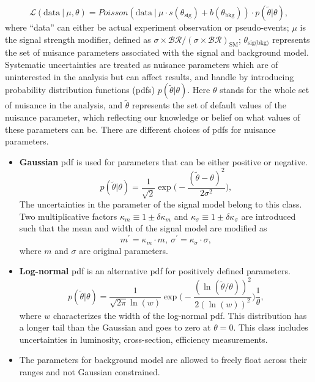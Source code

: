 	\begin{equation}
	\mathcal{L}(\text{data}\ |\ \mu ,\theta) = Poisson(\text{data}\ |\ \mu\cdot s(\theta_{\text{sig}}) + b(\theta_{\text{bkg}}))\cdot p(\tilde{\theta}|\theta),
	\end{equation}
	where ``data'' can either be actual experiment observation or pseudo-events; $\mu$ is the signal strength modifier, defined as $\sigma\times\mathcal{BR}/(\sigma\times\mathcal{BR})_{\text{SM}}$; $\theta_{\text{sig(bkg)}}$ represents the set of nuisance parameters associated with the signal and background model.
	Systematic uncertainties are treated as nuisance parameters which are of uninterested in the analysis but can affect results, and handle by introducing probability distribution functions (pdfs) $p(\tilde{\theta}|\theta)$.
 Here $\theta$ stands for the whole set of nuisance in the analysis, and $\tilde{\theta}$ represents the set of default values of the nuisance parameter, which reflecting our knowledge or belief on what values of these parameters can be. 
 	There are different choices of pdfs for nuisance parameters.
 	\begin{itemize}
		\item \textbf{Gaussian} pdf is used for parameters that can be either positive or negative.
		\begin{equation}
			p(\tilde{\theta}|\theta)=\frac{1}{\sqrt{2}}\exp\bigg(-\frac{(\tilde{\theta}-\theta)^{2}}{2\sigma^{2}}\bigg),
		\end{equation}
	The uncertainties in the parameter of the signal model belong to this class. Two multiplicative factors $\kappa_{m}\equiv 1\pm\delta\kappa_{m}$ and $\kappa_{\sigma}\equiv 1\pm\delta\kappa_{\sigma}$ are introduced such that the mean and width of the signal model are modified as
	\begin{equation}
			m^{\prime}=\kappa_{m}\cdot m,\ \sigma^{\prime}=\kappa_{\sigma}\cdot \sigma,
	\end{equation}
where $m$ and $\sigma$ are original parameters. 
		  
	\item \textbf{Log-normal} pdf is an alternative pdf for positively defined parameters.
	\begin{equation}
			p(\tilde{\theta}|\theta)=\frac{1}{\sqrt{2\pi}\ln(w)}\exp\bigg(-\frac{(\ln(\tilde{\theta}/\theta))^{2}}{2(\ln(w))^{2}}\bigg)\frac{1}{\theta},
		\end{equation}
		where $w$ characterizes the width of the log-normal pdf. This distribution has a longer tail than the Gaussian and goes to zero at $\theta=0$. 
		This class includes uncertainties in luminosity, cross-section, efficiency measurements. 
		
		\item The parameters for background model are allowed to freely float across their ranges and not Gaussian constrained.
	\end{itemize}

